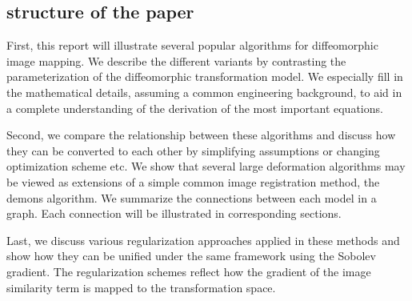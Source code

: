 \documentclass[letterpaper,12pt]{article}
\begin{document}
\subsection{structure of the paper}

First, this report will illustrate several popular algorithms for
diffeomorphic image mapping. We describe the different variants by
contrasting the parameterization of the diffeomorphic transformation
model. We especially fill in the mathematical details, assuming a
common engineering background, to aid in a complete understanding of
the derivation of the most important equations. 

Second, we compare the relationship between these algorithms and
discuss how they can be converted to each other by simplifying
assumptions or changing optimization scheme etc. We show that several
large deformation algorithms may be viewed as
extensions of a simple common image registration method, the demons algorithm. We summarize the connections between each model in a graph. Each connection will be illustrated in corresponding sections.

Last, we discuss various regularization approaches applied in these
methods and show how they can be unified under the same framework
using the Sobolev gradient. The regularization schemes reflect how the
gradient of the image similarity term is mapped to the transformation space.




\newcommand{\vect}[1]{\mathbf{#1}}
\newcommand{\field}[1]{\mathbf{#1}}
\newcommand{\image}[1]{#1}
\newcommand{\I}{\image{I}}
\newcommand{\J}{\image{J}}
\renewcommand{\u}{\vect{u}}
\renewcommand{\v}{\vect{v}}
\renewcommand{\c}{\vect{c}}
\newcommand{\h}{\vect{h}}
\newcommand{\w}{\vect{w}}
\newcommand{\myphi}{\phi}
\newcommand{\mypsi}{\psi}
\newcommand{\D}{D}
\renewcommand{\d}{\nabla}
\newcommand{\dd}{\text{d}}
\newcommand{\p}{\partial}
\renewcommand{\L}{\Delta} %
\newcommand{\R}{\mathbb{R}}
\newcommand{\myS}{S}
\newcommand{\myR}{R}
\newcommand{\myE}{E}
\newcommand{\ld}{\langle}
\newcommand{\rd}{\rangle}
\newcommand{\LL}{\mathcal{L}} %
\newcommand{\tQ}{\mathcal{Q}}
\newcommand{\Id}{\text{Id}}
\newcommand{\tG}{{G}} %
\newcommand{\Diff}{\text{Diff}}
\newcommand{\VV}{\mathcal{V}}
\newcommand{\opL}{\mathcal{L}}
\end{document}
